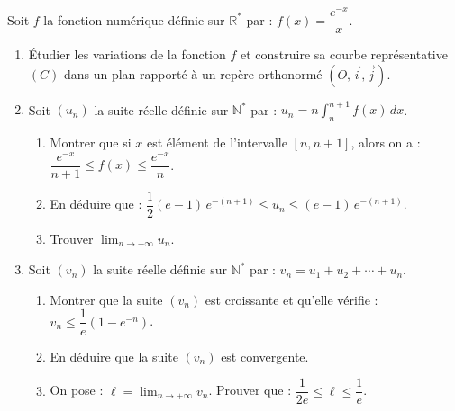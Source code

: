 \documentclass{axiobac}
\begin{document}
\begin{probleme}{}


Soit $f$ la fonction numérique définie sur $\mathbb{R}^*$ par : $f(x) = \dfrac{e^{-x}}{x}$.

\begin{enumerate}
    \item Étudier les variations de la fonction $f$ et construire sa courbe représentative $(C)$ dans un plan rapporté à un repère orthonormé $(O, \vec{i}, \vec{j})$.
    \item Soit $(u_n)$ la suite réelle définie sur $\mathbb{N}^*$ par : $u_n = n \displaystyle\int_n^{n+1} f(x)\,dx$.
    \begin{enumerate}
        \item Montrer que si $x$ est élément de l'intervalle $[n, n+1]$, alors on a : $\dfrac{e^{-x}}{n+1} \leqslant f(x) \leqslant \dfrac{e^{-x}}{n}$.
        \item En déduire que : $\dfrac{1}{2}(e - 1)\,e^{-(n+1)} \leqslant u_n \leqslant (e - 1)\,e^{-(n+1)}$.
        \item Trouver $\displaystyle\lim_{n \to +\infty} u_n$.
    \end{enumerate}
    \item Soit $(v_n)$ la suite réelle définie sur $\mathbb{N}^*$ par : $v_n = u_1 + u_2 + \cdots + u_n$.
    \begin{enumerate}
        \item Montrer que la suite $(v_n)$ est croissante et qu'elle vérifie : $v_n \leqslant \dfrac{1}{e}\left(1 - e^{-n}\right)$.
        \item En déduire que la suite $(v_n)$ est convergente.
        \item On pose : $\ell = \displaystyle\lim_{n \to +\infty} v_n$. Prouver que : $\dfrac{1}{2e} \leqslant \ell \leqslant \dfrac{1}{e}$.
    \end{enumerate}
\end{enumerate}



\end{probleme}
\end{document}
